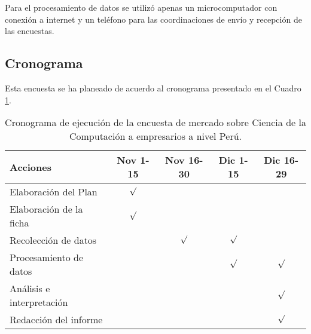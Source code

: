 Para el procesamiento de datos se utilizó apenas un microcomputador con conexión a internet y un teléfono para las coordinaciones de envío y recepción de las encuestas.

\subsection{Cronograma}
Esta encuesta se ha planeado de acuerdo al cronograma presentado en el Cuadro \ref{tab:cronograma-de-la-encuesta}.

\begin{center}
\begin{table}[h!]
\begin{tabularx}{\textwidth}{|X|c|c|c|c|}\hline
\textbf{Acciones}       & \textbf{Nov 1-15} & \textbf{Nov 16-30} & D\textbf{ic 1-15} & \textbf{Dic 16-29} \\ \hline
Elaboración del Plan    &  $\surd$ &           &          &           \\ \hline
Elaboración de la ficha &  $\surd$ &           &          &           \\ \hline
Recolección de datos    &          & $\surd$   &  $\surd$ &           \\ \hline
Procesamiento de datos  &          &           &  $\surd$ &  $\surd$  \\ \hline
Análisis e interpretación&          &           &          &  $\surd$  \\ \hline
Redacción del informe   &          &           &          &  $\surd$  \\ \hline
\end{tabularx}
\caption{Cronograma de ejecución de la encuesta de mercado sobre Ciencia de la Computación a empresarios a nivel Perú.}
\label{tab:cronograma-de-la-encuesta}
\end{table}
\end{center}
